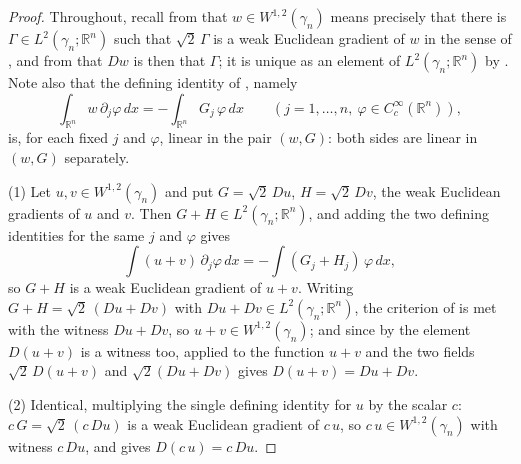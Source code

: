 \begin{proof}
Throughout, recall from  that $w \in W^{1,2}(\gamma_n)$ means
precisely that there is $\Gamma \in L^2(\gamma_n;\mathbb{R}^n)$ such that
$\sqrt2\,\Gamma$ is a weak Euclidean gradient of $w$ in the sense of
, and from  that $Dw$ is then that
$\Gamma$; it is unique as an element of $L^2(\gamma_n;\mathbb{R}^n)$ by
.  Note also that the defining identity of
, namely
\[
  \int_{\mathbb{R}^n} w\,\partial_j\varphi\, dx
    = -\int_{\mathbb{R}^n} G_j\,\varphi\, dx
  \qquad (j = 1,\ldots,n,\ \varphi \in C_c^\infty(\mathbb{R}^n)),
\]
is, for each fixed $j$ and $\varphi$, linear in the pair $(w, G)$: both sides are
linear in $(w,G)$ separately.

(1) Let $u,v \in W^{1,2}(\gamma_n)$ and put $G = \sqrt2\,Du$,
$H = \sqrt2\,Dv$, the weak Euclidean gradients of $u$ and $v$.  Then
$G + H \in L^2(\gamma_n;\mathbb{R}^n)$, and adding the two defining identities
for the same $j$ and $\varphi$ gives
\[
  \int (u+v)\,\partial_j\varphi\, dx
    = -\int (G_j + H_j)\,\varphi\, dx ,
\]
so $G+H$ is a weak Euclidean gradient of $u+v$.  Writing
$G + H = \sqrt2\,(Du + Dv)$ with $Du + Dv \in L^2(\gamma_n;\mathbb{R}^n)$, the
criterion of  is met with the witness $Du+Dv$, so
$u + v \in W^{1,2}(\gamma_n)$; and since by  the element
$D(u+v)$ is a witness too,  applied to the
function $u+v$ and the two fields $\sqrt2\,D(u+v)$ and $\sqrt2(Du+Dv)$ gives
$D(u+v) = Du + Dv$.

(2) Identical, multiplying the single defining identity for $u$ by the scalar
$c$: $c\,G = \sqrt2\,(c\,Du)$ is a weak Euclidean gradient of $c\,u$, so
$c\,u \in W^{1,2}(\gamma_n)$ with witness $c\,Du$, and
 gives $D(c\,u) = c\,Du$.


\end{proof}
